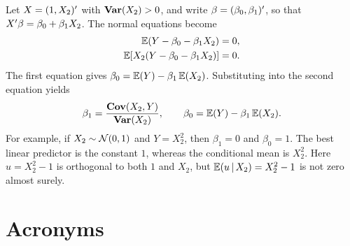 \documentclass[a4paper,12pt]{article}
\begin{document}
\begin{example}\label{eg-population-simple-regression}
	Let $X=(1,X_2)^{\prime}$ with $\operatorname{\text{\textrm{\upshape\textbf{Var}}}}(X_2)>0$, and write $\beta=(\beta_0,\beta_1)^{\prime}$,
	so that $X^{\prime}\beta=\beta_0+\beta_1 X_2$.
	The normal equations become
	\begin{align*}
		\operatorname{\mathbb{E}}(Y-\beta_0-\beta_1X_2)&=0,\\
		\operatorname{\mathbb{E}}[X_2(Y-\beta_0-\beta_1X_2)]&=0.
	\end{align*}
	The first equation gives $\beta_0=\operatorname{\mathbb{E}}(Y)-\beta_1\operatorname{\mathbb{E}}(X_2)$.
	Substituting into the second equation yields
	\begin{align}
		\beta_1=\frac{\operatorname{\text{\textrm{\upshape\textbf{Cov}}}}(X_2,Y)}{\operatorname{\text{\textrm{\upshape\textbf{Var}}}}(X_2)},
		\qquad \beta_0=\operatorname{\mathbb{E}}(Y)-\beta_1\operatorname{\mathbb{E}}(X_2).
	\end{align}
	For example, if $X_2\sim\operatorname{\mathcal{N}}(0,1)$ and $Y=X_2^2$,
	then $\beta_1=0$ and $\beta_0=1$.
	The best linear predictor is the constant $1$, whereas the conditional mean is $X_2^2$.
	Here $u=X_2^2-1$ is orthogonal to both $1$ and $X_2$, but $\operatorname{\mathbb{E}}(u\mathpunct{}|\mathpunct{} X_2)=X_2^2-1$ is not zero almost surely.
\end{example}

\vfill
\section*{Acronyms}
\printglossaries
\end{document}
